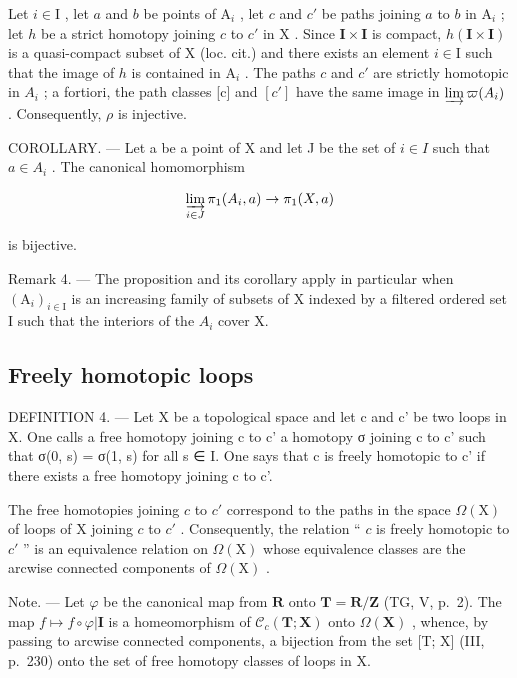 Let \(i \in \mathrm{I}\) , let \(a\) and \(b\) be points of \(\mathrm{A}_i\) , let \(c\) and \(c'\) be paths joining \(a\) to \(b\) in \(\mathrm{A}_i\) ; let \(h\) be a strict homotopy joining \(c\) to \(c'\) in \(\mathrm{X}\) . Since \(\mathbf{I} \times \mathbf{I}\) is compact, \(h(\mathbf{I} \times \mathbf{I})\) is a quasi-compact subset of \(\mathrm{X}\) (loc. cit.) and there exists an element \(i \in \mathrm{I}\) such that the image of \(h\) is contained in \(\mathrm{A}_i\) . The paths \(c\) and \(c'\) are strictly homotopic in \(A_{i}\) ; a fortiori, the path classes {[}c{]} and \([c']\) have the same image in \(\varinjlim\varpi(A_{i})\) . Consequently, \(\rho\) is injective.

COROLLARY. --- Let a be a point of X and let J be the set of \(i \in I\) such that \(a \in A_{i}\) . The canonical homomorphism

\[
\varinjlim_ {i \in J} \pi_ {1} (A _ {i}, a) \to \pi_ {1} (X, a)
\]

is bijective.

Remark 4. --- The proposition and its corollary apply in particular when \((\mathrm{A}_{i})_{i\in\mathrm{I}}\) is an increasing family of subsets of X indexed by a filtered ordered set I such that the interiors of the \(A_{i}\) cover X.

\subsection{Freely homotopic loops}

DEFINITION 4. --- Let X be a topological space and let c and c' be two loops in X. One calls a free homotopy joining c to c' a homotopy σ joining c to c' such that σ(0, s) = σ(1, s) for all s ∈ I. One says that c is freely homotopic to c' if there exists a free homotopy joining c to c'.

The free homotopies joining \(c\) to \(c'\) correspond to the paths in the space \(\Omega(\mathrm{X})\) of loops of X joining \(c\) to \(c'\) . Consequently, the relation “ \(c\) is freely homotopic to \(c'\) ” is an equivalence relation on \(\Omega(\mathrm{X})\) whose equivalence classes are the arcwise connected components of \(\Omega(\mathrm{X})\) .

Note. --- Let \(\varphi\) be the canonical map from \(\mathbf{R}\) onto \(\mathbf{T} = \mathbf{R}/\mathbf{Z}\) (TG, V, p.~2). The map \(f \mapsto f \circ \varphi|\mathbf{I}\) is a homeomorphism of \(\mathcal{C}_c(\mathbf{T};\mathbf{X})\) onto \(\Omega(\mathbf{X})\) , whence, by passing to arcwise connected components, a bijection from the set {[}T; X{]} (III, p.~230) onto the set of free homotopy classes of loops in X.

